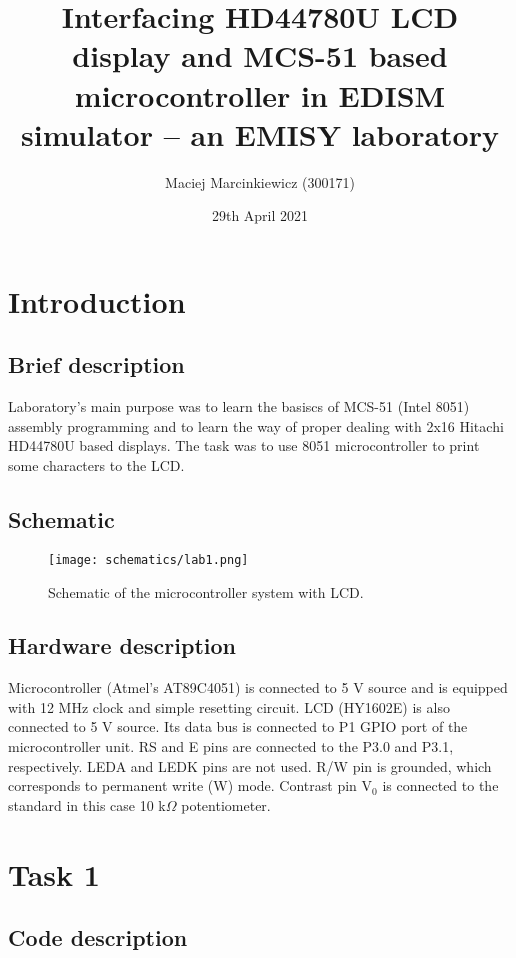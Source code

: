 \documentclass{article}
\title{Interfacing HD44780U LCD display and MCS-51 based microcontroller in EDISM simulator -- an EMISY laboratory}
\author{Maciej Marcinkiewicz (300171)}
\date{29th April 2021}
\begin{document}
\maketitle

\section{Introduction}
\subsection{Brief description}
Laboratory's main purpose was to learn the basiscs of MCS-51 (Intel 8051) assembly
programming and to learn the way of proper dealing with 2x16 Hitachi HD44780U based displays.
The task was to use 8051 microcontroller to print some characters to the LCD.

\subsection{Schematic}
\begin{figure}[h!] %
    \centering
        \texttt{[image: schematics/lab1.png]}
    \caption{Schematic of the microcontroller system with LCD.}
\end{figure}

\subsection{Hardware description}
Microcontroller (Atmel's AT89C4051) is connected to 5 V source and is equipped with 12 MHz clock and 
simple resetting circuit. LCD (HY1602E) is also connected to 5 V source. Its data bus is connected
to P1 GPIO port of the microcontroller unit. RS and E pins are connected to the P3.0 and P3.1,
respectively. LEDA and LEDK pins are not used. R/W pin is grounded, which corresponds to
permanent write (W) mode. Contrast pin V$_0$ is connected to the standard in this case 10 k$\Omega$ potentiometer.

\section{Task 1}
\subsection{Code description}
\end{document}

